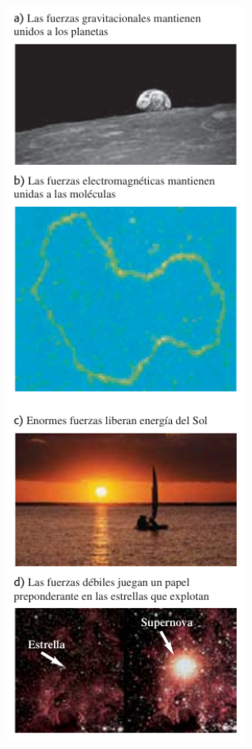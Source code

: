 \documentclass{article}
\begin{document}
\begin{multicols}{2}
        \begin{minipage}{0.6\textwidth}
            \centering
            \includegraphics[width=0.6\textwidth]{img/3.3-9.png}
        \end{minipage}
    \end{multicols}

    \vspace{2cm}
\end{document}
